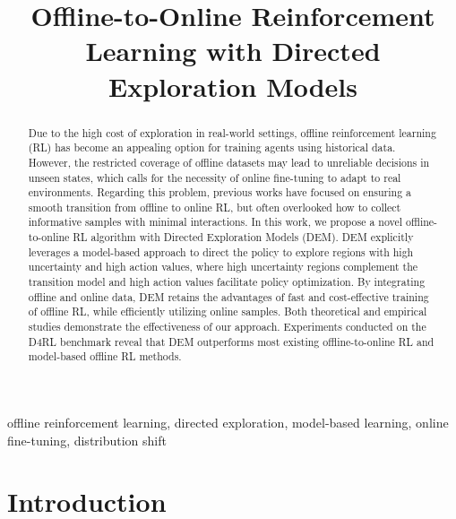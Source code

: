 \documentclass[conference]{IEEEtran}
\begin{document}
\title{Offline-to-Online Reinforcement Learning with Directed Exploration Models}

\author{
}

\maketitle

\begin{abstract}
Due to the high cost of exploration in real-world settings, offline reinforcement learning (RL) has become an appealing option for training agents using historical data. However, the restricted coverage of offline datasets may lead to unreliable decisions in unseen states, which calls for the necessity of online fine-tuning to adapt to real environments. Regarding this problem, previous works have focused on ensuring a smooth transition from offline to online RL, but often overlooked how to collect informative samples with minimal interactions. In this work, we propose a novel offline-to-online RL algorithm with Directed Exploration Models (DEM). DEM explicitly leverages a model-based approach to direct the policy to explore regions with high uncertainty and high action values, where high uncertainty regions complement the transition model and high action values facilitate policy optimization. By integrating offline and online data, DEM retains the advantages of fast and cost-effective training of offline RL, while efficiently utilizing online samples. Both theoretical and empirical studies demonstrate the effectiveness of our approach. Experiments conducted on the D4RL benchmark reveal that DEM outperforms most existing offline-to-online RL and model-based offline RL methods.
\end{abstract}

\begin{IEEEkeywords}
offline reinforcement learning, directed exploration, model-based learning, online fine-tuning, distribution shift
\end{IEEEkeywords}

\section{Introduction}
\end{document}
